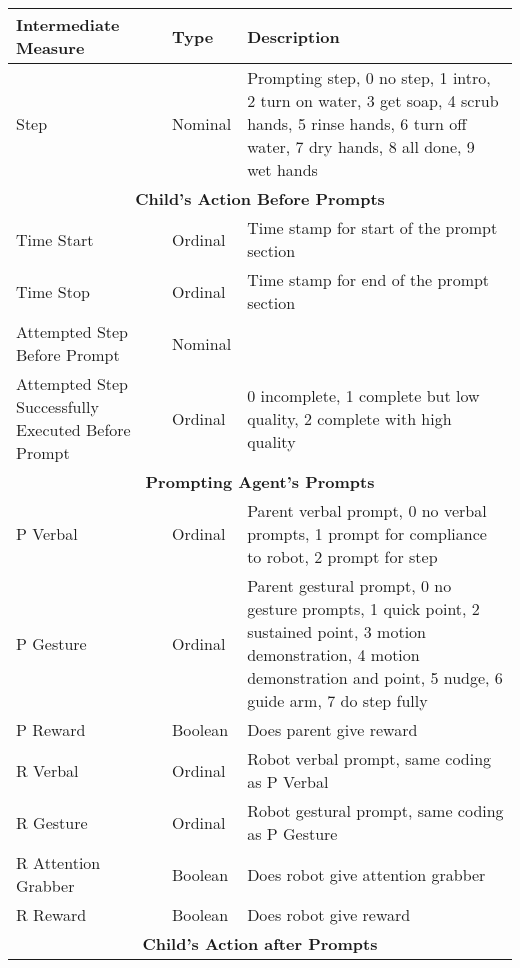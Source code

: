 \begin{table}[h]
	\centering
	\begin{tabular}{ | p{5cm} | l | p{7cm} | }
		\hline
		\textbf{Intermediate Measure}	&	\textbf{Type}	&	\textbf{Description}	\\	\hline	\hline
		
		Step	&	Nominal	&	Prompting step, 0 no step, 1 intro, 2 turn on water, 3 get soap, 4 scrub hands, 5 rinse hands, 6 turn off water, 7 dry hands, 8 all done, 9 wet hands	\\	\hline \hline
	
		\multicolumn{3}{|c|}{\textbf{Child's Action Before Prompts}} \\	\hline
	
		Time Start	&	Ordinal	&	Time stamp for start of the prompt section	\\	\hline
		Time Stop	&	Ordinal	&	Time stamp for end of the prompt section	\\	\hline
		Attempted Step Before Prompt	&	Nominal	&		\\	\hline
		Attempted Step Successfully Executed Before Prompt	&	Ordinal	&	0 incomplete, 1 complete but low quality, 2 complete with high quality	\\	\hline	\hline
		
		\multicolumn{3}{|c|}{\textbf{Prompting Agent's Prompts}} \\	\hline
		
		P Verbal	&	Ordinal	&	Parent verbal prompt, 0 no verbal prompts, 1 prompt for compliance to robot, 2 prompt for step	\\	\hline
		P Gesture	&	Ordinal	&	Parent gestural prompt, 0 no gesture prompts, 1 quick point, 2 sustained point, 3 motion demonstration, 4 motion demonstration and point, 5 nudge, 6 guide arm, 7 do step fully	\\	\hline
		P Reward	&	Boolean	&	Does parent give reward	\\	\hline
		R Verbal	&	Ordinal	&	Robot verbal prompt, same coding as P Verbal	\\	\hline
		R Gesture	&	Ordinal	&	Robot gestural prompt, same coding as P Gesture	\\	\hline
		R Attention Grabber	&	Boolean	&	Does robot give attention grabber	\\	\hline
		R Reward	&	Boolean	&	Does robot give reward	\\	\hline	\hline
		
		\multicolumn{3}{|c|}{\textbf{Child's Action after Prompts}} \\	\hline
		

\end{tabular}
\end{table}
